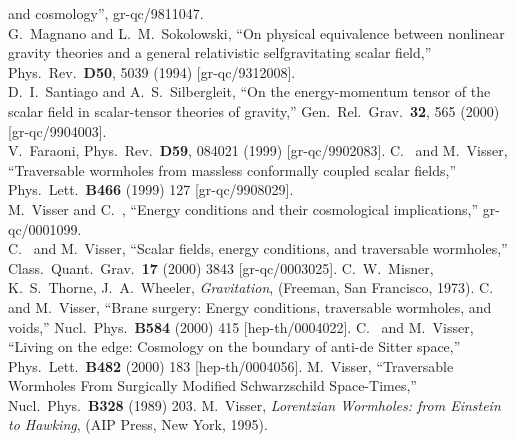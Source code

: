 \documentclass[a4paper,10pt]{article}
\begin{document}
\begin{thebibliography}{99}
 and cosmology'', gr-qc/9811047.
\\
G.~Magnano and L.~M.~Sokolowski,
``On physical equivalence between nonlinear gravity theories 
and a general relativistic selfgravitating scalar field,''
Phys.\ Rev.\  {\bf D50}, 5039 (1994)
[gr-qc/9312008].
\\
D.~I.~Santiago and A.~S.~Silbergleit,
``On the energy-momentum tensor of the scalar field in scalar-tensor 
theories of gravity,''
Gen.\ Rel.\ Grav.\  {\bf 32}, 565 (2000)
[gr-qc/9904003].
\\
V.~Faraoni,
Phys.\ Rev.\  {\bf D59}, 084021 (1999)
[gr-qc/9902083].
C.~{\Barcelo} and M.~Visser,
``Traversable wormholes from massless conformally coupled scalar fields,''
Phys.\ Lett.\  {\bf B466} (1999) 127
[gr-qc/9908029].
\\
M.~Visser and C.~{\Barcelo},
``Energy conditions and their cosmological implications,''
gr-qc/0001099.
\\
C.~{\Barcelo} and M.~Visser,
``Scalar fields, energy conditions, and traversable wormholes,''
Class.\ Quant.\ Grav.\  {\bf 17} (2000) 3843
[gr-qc/0003025].
C.~W.~Misner, K.~S.~Thorne, J.~A.~Wheeler,
{\emph{Gravitation}}, (Freeman, San Francisco, 1973).
C.~{\Barcelo} and M.~Visser,
``Brane surgery: Energy conditions, traversable wormholes, and voids,''
Nucl.\ Phys.\  {\bf B584} (2000) 415 [hep-th/0004022].
C.~{\Barcelo} and M.~Visser,
``Living on the edge: Cosmology on the boundary of anti-de Sitter space,''
Phys.\ Lett.\  {\bf B482} (2000) 183
[hep-th/0004056].
M.~Visser,
``Traversable Wormholes From Surgically Modified Schwarzschild Space-Times,''
Nucl.\ Phys.\  {\bf B328} (1989) 203.
M.~Visser,
{\sl Lorentzian Wormholes: from Einstein to Hawking},
(AIP Press, New York, 1995).
\end{thebibliography} 
\end{document}
